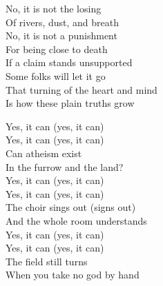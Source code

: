 \begin{lyrics}
No, it is not the losing\\
Of rivers, dust, and breath\\
No, it is not a punishment\\
For being close to death\\
If a claim stands unsupported\\
Some folks will let it go\\
That turning of the heart and mind\\
Is how these plain truths grow

Yes, it can (yes, it can)\\
Yes, it can (yes, it can)\\
Can atheism exist\\
In the furrow and the land?\\
Yes, it can (yes, it can)\\
Yes, it can (yes, it can)\\
The choir sings out (signs out)\\
And the whole room understands\\
Yes, it can (yes, it can)\\
Yes, it can (yes, it can)\\
The field still turns\\
When you take no god by hand
\end{lyrics}

